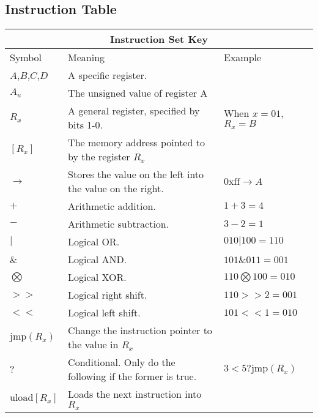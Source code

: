 \documentclass[11pt]{article}
\begin{document}
\subsection{Instruction Table}
\begin{tabular}{|l | l | l|}
\hline
\multicolumn{3}{|c|}{ \textbf{Instruction Set Key}} \\
\hline
Symbol & Meaning & Example\\
\hline
$A$,$B$,$C$,$D$ & A specific register.\\
$A_u$ & The unsigned value of register A & \\
$R_x$ & A general register, specified by bits 1-0. & When $x=01$, $R_x = B$\\
$[R_x]$ & The memory address pointed to by the register $R_x$ &\\
$\rightarrow$ & Stores the value on the left into the value on the right. & $\mathrm{0xff} \rightarrow A$\\
$+$ & Arithmetic addition. & $1 + 3 = 4$\\
$-$ & Arithmetic subtraction. & $3 - 2 = 1$\\
$|$ & Logical OR. & $010 | 100 = 110$\\
$\&$ & Logical AND. & $101 \& 011 = 001$\\
$\bigotimes$ & Logical XOR. & $110 \bigotimes 100 = 010$\\
$>>$ & Logical right shift.& $110 >> 2 = 001$\\
$<<$ & Logical left shift. & $101 << 1 = 010$\\
$\mathrm{jmp}(R_x)$ & Change the instruction pointer to the value in $R_x$&\\
$?$ & Conditional. Only do the following if the former is true.& $3 < 5 ? \mathrm{jmp}(R_x)$\\
$\mathrm{uload}[R_x]$ & Loads the next instruction into $R_x$ & \\
\hline
\end{tabular}
\\ \\ \\
\end{document}
